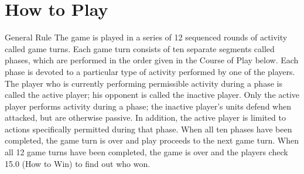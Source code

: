 \section{How to Play}

\begin{rulebox}{General Rule}
The game is played in a series of 12 sequenced rounds of activity called game turns. Each game turn consists of ten separate segments called phases, which are performed in the order given in the Course of Play below. Each phase is devoted to a particular type of activity performed by one of the players. The player who is currently performing permissible activity during a phase is called the active player; his opponent is called the inactive player. Only the active player performs activity during a phase; the inactive player's units defend when attacked, but are otherwise passive. In addition, the active player is limited to actions specifically permitted during that phase. When all ten phases have been completed, the game turn is over and play proceeds to the next game turn. When all 12 game turns have been completed, the game is over and the players check 15.0 (How to Win) to find out who won.
\end{rulebox}


